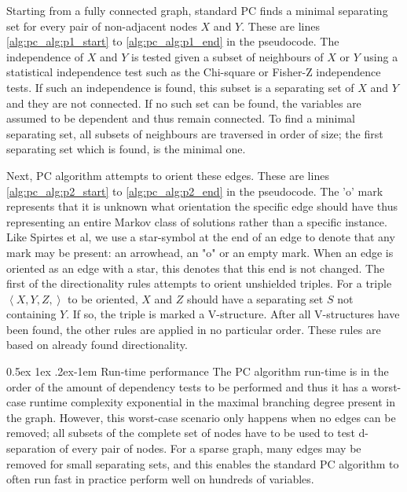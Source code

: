 \documentclass[a4paper, 10pt, english, onecolumn]{article}
\makeatletter
\renewcommand{\paragraph}{%
  \@startsection{paragraph}{4}%
  {\z@}{0.5ex \@plus 1ex \@minus .2ex}{-1em}%
  {\normalfont\normalsize\bfseries}%
}
\makeatother
\begin{document}
Starting from a fully connected graph, standard PC finds a minimal separating set for every pair of non-adjacent nodes $X$ and $Y$.
These are lines \ref{alg:pc_alg:p1_start} to \ref{alg:pc_alg:p1_end} in the pseudocode.
The independence of $X$ and $Y$ is tested given a subset of neighbours of $X$ or $Y$ using a statistical independence test such as the Chi-square or Fisher-Z independence tests. %
If such an independence is found, this subset is a separating set of $X$ and $Y$ and they are not connected.
If no such set can be found, the variables are assumed to be dependent and thus remain connected.
To find a minimal separating set, all subsets of neighbours are traversed in order of size; the first separating set which is found, is the minimal one.

Next, PC algorithm attempts to orient these edges.
These are lines \ref{alg:pc_alg:p2_start} to \ref{alg:pc_alg:p2_end} in the pseudocode.
The 'o' mark represents that it is unknown what orientation the specific edge should have thus representing an entire Markov class of solutions rather than a specific instance.
Like Spirtes et al, we use a star-symbol at the end of an edge to denote that any mark may be present: an arrowhead, an "o" or an empty mark.
When an edge is oriented as an edge with a star, this denotes that this end is not changed.
The first of the directionality rules attempts to orient unshielded triples.
For a triple $\left < X,Y,Z, \right>$ to be oriented, $X$ and $Z$ should have a separating set $S$ not containing $Y$.
If so, the triple is marked a V-structure.
After all V-structures have been found, the other rules are applied in no particular order.
These rules are based on already found directionality.

\paragraph{Run-time performance}
The PC algorithm run-time is in the order of the amount of dependency tests to be performed and thus it has a worst-case runtime complexity exponential in the maximal branching degree present in the graph.
However, this worst-case scenario only happens when no edges can be removed; all subsets of the complete set of nodes have to be used to test d-separation of every pair of nodes.
For a sparse graph, many edges may be removed for small separating sets, and this enables the standard PC algorithm to often run fast in practice perform well on hundreds of variables. %
\end{document}
